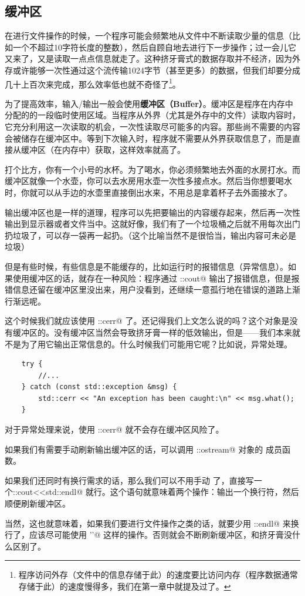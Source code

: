 \subsection*{缓冲区}
在进行文件操作的时候，一个程序可能会频繁地从文件中不断读取少量的信息（比如一个不超过10字符长度的整数），然后自顾自地去进行下一步操作；过一会儿它又来了，又是读取一点点信息就走了。这种挤牙膏式的数据存取并不经济，因为外存或许能够一次性通过这个流传输1024字节（甚至更多）的数据，但我们却要分成几十上百次来完成，那么效率低也就不奇怪了\footnote{程序访问外存（文件中的信息存储于此）的速度要比访问内存（程序数据通常存储于此）的速度慢得多，我们在第一章中就提及过了。}。\par
为了提高效率，输入/输出一般会使用\textbf{缓冲区（Buffer）}。缓冲区是程序在内存中分配的的一段临时使用区域。当程序从外界（尤其是外存中的文件）读取内容时，它充分利用这一次读取的机会，一次性读取尽可能多的内容。那些尚不需要的内容会被储存在缓冲区中。等到下次输入时，程序就不需要从外界获取信息了，而是直接从缓冲区（在内存中）获取，这样效率就高了。\par
打个比方，你有一个小号的水杯。为了喝水，你必须频繁地去外面的水房打水。而缓冲区就像一个水壶，你可以去水房用水壶一次性多接点水。然后当你想要喝水时，你就可以从手边的水壶里直接倒出水来，不用总是拿着杯子去外面接水了。\par
输出缓冲区也是一样的道理，程序可以先把要输出的内容缓存起来，然后再一次性输出到显示器或者文件当中。这就好像，我们有了一个垃圾桶之后就不用每次出门扔垃圾了，可以存一袋再一起扔。（这个比喻当然不是很恰当，输出内容可未必是垃圾）\par
但是有些时候，有些信息是不能缓存的，比如运行时的报错信息（异常信息）。如果使用缓冲区的话，就存在一种风险：程序通过 \lstinline@std::cout@ 输出了报错信息，但是报错信息还留在缓冲区里没出来，用户没看到，还继续一意孤行地在错误的道路上渐行渐远呢。\par
这个时候我们就应该使用 \lstinline@std::cerr@ 了。还记得我们上文怎么说的吗？这个对象是没有缓冲区的。没有缓冲区当然会导致挤牙膏一样的低效输出，但是——我们本来就不是为了用它输出正常信息的。什么时候我们可能用它呢？比如说，异常处理。
\begin{lstlisting}
    try {
        //...
    } catch (const std::exception &msg) {
        std::cerr << "An exception has been caught:\n" << msg.what();
    }
\end{lstlisting}
对于异常处理来说，使用 \lstinline@std::cerr@ 就不会存在缓冲区风险了。\par
如果我们有需要手动刷新输出缓冲区的话，可以调用 \lstinline@std::ostream@ 对象的 \lstinline@flush@ 成员函数。\par
如果我们还同时有换行需求的话，那么我们可以不用手动 \lstinline@flush@ 了，直接写一个\newline\lstinline@std::cout<<std::endl@ 就行。这个语句就意味着两个操作：输出一个换行符，然后顺便刷新缓冲区。\par
当然，这也就意味着，如果我们要进行文件操作之类的话，就要少用 \lstinline@std::endl@ 来换行了，应该尽可能使用 \lstinline@'\n'@ 这样的操作。否则就会不断刷新缓冲区，和挤牙膏没什么区别了。\par\pagebreak
